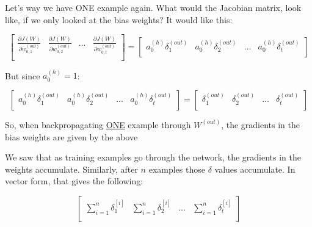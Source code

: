 \documentclass[../main.tex]{subfiles}
\begin{document}
Let's way we have ONE example again. What would the Jacobian matrix, look like, if we only looked at the bias weights?
It would like this:

\[
    \begin{bmatrix}
        \frac{\partial J(W)}{\partial w_{0,1}^{(out)}} & \frac{\partial J(W)}{\partial w_{0,2}^{(out)}} & \dots & \frac{\partial J(W)}{\partial w_{0,t}^{(out)}} \\
    \end{bmatrix}
    =
    \begin{bmatrix}
        a_0^{(h)} \delta_1^{(out)}  & a_0^{(h)} \delta_2^{(out)}    & \dots  & a_0^{(h)} \delta_t^{(out)}   \\
    \end{bmatrix}
\]

But since $a_0^{(h)} = 1$:

\[
    \begin{bmatrix}
        a_0^{(h)} \delta_1^{(out)}  & a_0^{(h)} \delta_2^{(out)}    & \dots  & a_0^{(h)} \delta_t^{(out)}   \\
    \end{bmatrix}
    =
    \begin{bmatrix}
        \delta_1^{(out)}  & \delta_2^{(out)}    & \dots  & \delta_t^{(out)}   \\
    \end{bmatrix}  
\]

So, when backpropagating \underline{ONE} example through $W^{(out)}$, the gradients in the bias weights are given by the above

\vspace{5mm} %

We saw that as training examples go through the network, the gradients in the weights accumulate. Similarly, after $n$ examples those $\delta$ values
accumulate. In vector form, that gives the following:

\vspace{5mm} %

\[
    \begin{bmatrix}
        \sum_{i=1}^{n}\delta_1^{[i]}  & \sum_{i=1}^{n}\delta_2^{[i]}    & \dots  & \sum_{i=1}^{n}\delta_t^{[i]}   \\
    \end{bmatrix}   
\]
\end{document}
